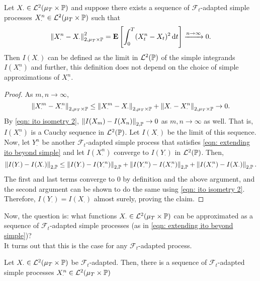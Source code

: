 \begin{lemma}
	Let $X_\cdot \in \mathcal{L}^2(\mu_T\times\mathbb{P})$ and suppose there exists a sequence of $\mathcal{F}_t$-adapted simple processes $X_\cdot^n \in \mathcal{L}^2(\mu_T\times\mathbb{P})$ such that
	\begin{equation}
		\label{eqn: extending ito beyond simple}
		\left\lVert X_\cdot^n - X_\cdot\right\rVert_{2,\mu_T\times\mathbb{P}}^2 = \textbf{E}\left[\int_0^T (X_t^n - X_t)^2 \operatorname{d}\!{t} \right] \xrightarrow[]{n\to\infty} 0.
	\end{equation}
	Then $I(X_\cdot)$ can be defined as the limit in $\mathcal{L}^2(\mathbb{P})$ of the simple integrands $I(X^n_\cdot)$ and further, this definition does not depend on the choice of simple approximations of $X_\cdot^n$.
\end{lemma}
\begin{proof}
	As $m,n\to\infty$,
	\[ \left\lVert X_\cdot^m - X_\cdot^n\right\rVert_{2,\mu_T\times\mathbb{P}} \leq \left\lVert X_\cdot^m - X_\cdot\right\rVert_{2,\mu_T\times\mathbb{P}} + \left\lVert X_\cdot - X_\cdot^n\right\rVert_{2,\mu_T\times\mathbb{P}} \to 0. \]
	By \eqref{eqn: ito isometry 2}, $\left\lVert I(X_m) - I(X_n)\right\rVert_{2,\mathbb{P}}\to 0$ as $m,n\to\infty$ as well. That is, $I(X_\cdot^n)$ is a Cauchy sequence in $\mathcal{L}^2(\mathbb{P})$. Let $I(X_\cdot)$ be the limit of this sequence.\\
	Now, let $Y_\cdot^n$ be another $\mathcal{F}_t$-adapted simple process that satisfies \eqref{eqn: extending ito beyond simple} and let $I(X_\cdot^n)$ converge to $I(Y_\cdot)$ in $\mathcal{L}^2(\mathbb{P})$. Then,
	\[ \left\lVert I(Y_\cdot) - I(X_\cdot)\right\rVert_{2,\mathbb{P}} \leq \left\lVert I(Y_\cdot) - I(Y_\cdot^n)\right\rVert_{2,\mathbb{P}} + \left\lVert I(Y_\cdot^n) - I(X_\cdot^n)\right\rVert_{2,\mathbb{P}} + \left\lVert I(X_\cdot^n) - I(X_\cdot)\right\rVert_{2,\mathbb{P}}. \]
	The first and last terms converge to $0$ by definition and the above argument, and the second argument can be shown to do the same using \eqref{eqn: ito isometry 2}.\\
	Therefore, $I(Y_\cdot) = I(X_\cdot)$ almost surely, proving the claim.
\end{proof}

Now, the question is: what functions $X_\cdot\in\mathcal{L}^2(\mu_T\times\mathbb{P})$ can be approximated as a sequence of $\mathcal{F}_t$-adapted simple processes (as in \eqref{eqn: extending ito beyond simple})?\\
It turns out that this is the case for any $\mathcal{F}_t$-adapted process.

\begin{lemma}
	Let $X_\cdot\in\mathcal{L}^2(\mu_T\times\mathbb{P})$ be $\mathcal{F}_t$-adapted. Then, there is a sequence of $\mathcal{F}_t$-adapted simple processes $X_\cdot^n\in\mathcal{L}^2(\mu_T\times\mathbb{P})$
\end{lemma}

